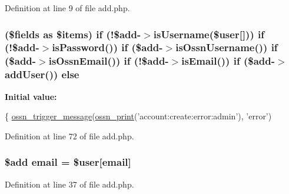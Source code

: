Definition at line 9 of file add.\+php.

\subsubsection[{\texorpdfstring{else}{else}}]{ (\$fields as \$items) {\bf if} (!\${\bf add}-\/$>$is\+Username(\${\bf user}\mbox{[}\textquotesingle{}\mbox{]})) {\bf if} (!\${\bf add}-\/$>$is\+Password()) {\bf if} (\${\bf add}-\/$>$is\+Ossn\+Username()) {\bf if} (\${\bf add}-\/$>$is\+Ossn\+Email()) {\bf if} (!\${\bf add}-\/$>$is\+Email()) {\bf if} (\${\bf add}-\/$>$add\+User()) else}\hypertarget{actions_2administrator_2user_2add_8php_a27056a6d292f1eb40b0390663fabac38}{}\label{actions_2administrator_2user_2add_8php_a27056a6d292f1eb40b0390663fabac38}
{\bfseries Initial value\+:}
\begin{DoxyCode}
\{
    \hyperlink{ossn_8lib_8system_8php_ab3f23f23f32f50c12e7aea0ffaccaac7}{ossn\_trigger\_message}(\hyperlink{ossn_8lib_8languages_8php_a2be5d1c4b695593a9b9067b96df2150a}{ossn\_print}(\textcolor{stringliteral}{'account:create:error:admin'}), \textcolor{stringliteral}{'error'})
\end{DoxyCode}


Definition at line 72 of file add.\+php.

\subsubsection[{\texorpdfstring{email}{email}}]{\setlength{\rightskip}{0pt plus 5cm}\${\bf add} email = \${\bf user}\mbox{[}\textquotesingle{}email\textquotesingle{}\mbox{]}}\hypertarget{actions_2administrator_2user_2add_8php_a011c66ae212438e0d7de7c0e40451bb3}{}\label{actions_2administrator_2user_2add_8php_a011c66ae212438e0d7de7c0e40451bb3}


Definition at line 37 of file add.\+php.

